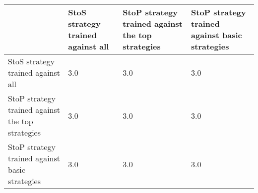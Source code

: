 \begin{tabular}{lP{0.25\textwidth}P{0.27\textwidth}P{0.27\textwidth}}
\toprule
{} &  StoS strategy trained against all &  StoP strategy trained against the top strategies &  StoP strategy trained against basic strategies \\
\midrule
StoS strategy trained against all                &                                3.0 &                                               3.0 &                                             3.0 \\
StoP strategy trained against the top strategies &                                3.0 &                                               3.0 &                                             3.0 \\
StoP strategy trained against basic strategies   &                                3.0 &                                               3.0 &                                             3.0 \\
\bottomrule
\end{tabular}
